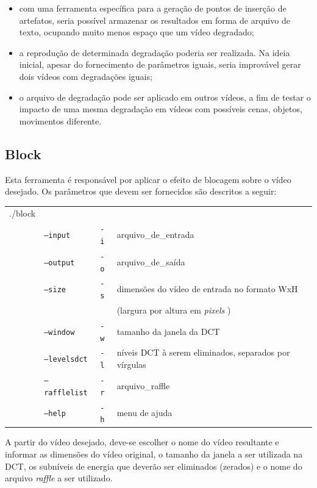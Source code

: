 \begin{itemize}
    \item com uma ferramenta específica para a geração de pontos de inserção de artefatos, seria possível armazenar os resultados em forma de arquivo de texto, ocupando muito menos espaço que um vídeo degradado;
    \item a reprodução de determinada degradação poderia ser realizada. Na ideia inicial, apesar do fornecimento de parâmetros iguais, seria improvável gerar dois vídeos com degradações iguais;
    \item o arquivo de degradação pode ser aplicado em outros vídeos, a fim de testar o impacto de uma mesma degradação em vídeos com possíveis cenas, objetos, movimentos diferente.
\end{itemize}

\subsection{Block}
\label{des:block}

Esta ferramenta é responsável por aplicar o efeito de blocagem sobre o vídeo desejado. Os parâmetros que devem ser fornecidos são descritos a seguir:

\begin{table}[!h]
	\begin{tabular}{llll}
	./block & & \\ 
	& \texttt{--input} & \texttt{-i}  & arquivo\_de\_entrada \\
	& \texttt{--output} & \texttt{-o}  & arquivo\_de\_saída \\
	& \texttt{--size} & \texttt{-s}  & dimensões do vídeo de entrada no formato WxH \\ 
	& & & (largura por altura em \emph{pixels} ) \\
	& \texttt{--window} & \texttt{-w}  & tamanho da janela da DCT \\
	& \texttt{--levelsdct} & \texttt{-l}  & níveis DCT à serem eliminados, separados por vírgulas \\
	& \texttt{--rafflelist} & \texttt{-r}  & arquivo\_raffle \\
	& \texttt{--help} & \texttt{-h}  & menu de ajuda \\
	\end{tabular}
\end{table}

A partir do vídeo desejado, deve-se escolher o nome do vídeo resultante e informar as dimensões do vídeo original, o tamanho da janela a ser utilizada na DCT, os subníveis de energia que deverão ser eliminados (zerados) e o nome do arquivo \emph{raffle} a ser utilizado.

